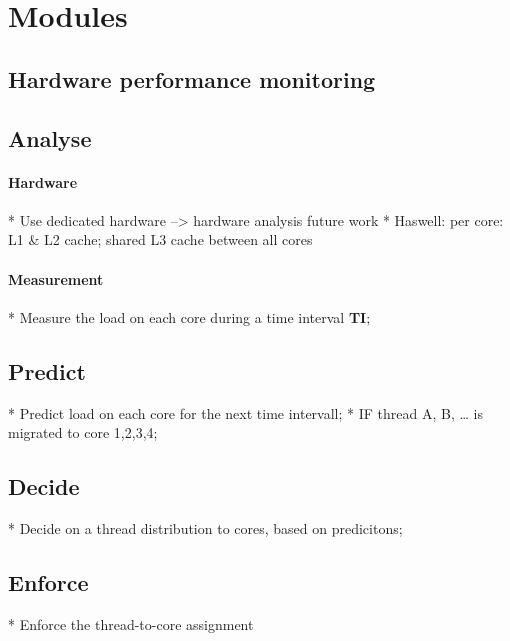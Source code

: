 \section{Modules}
\label{design:modules}

\subsection{Hardware performance monitoring}

\subsection{Analyse}
  \paragraph{Hardware}
    * Use dedicated hardware --> hardware analysis future work
    * Haswell: per core: L1 \& L2 cache; shared L3 cache between all cores

  \paragraph{Measurement}
    * Measure the load on each core during a time interval \textbf{TI};


\subsection{Predict}

  * Predict load on each core for the next time intervall;
    * IF thread {A, B, \ldots} is migrated to core {1,2,3,4};


\subsection{Decide}

  * Decide on a thread distribution to cores, based on predicitons;


\subsection{Enforce}

  * Enforce the thread-to-core assignment


